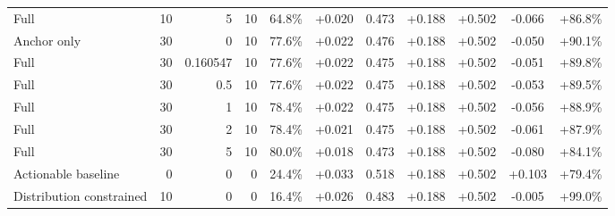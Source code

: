 \begin{table}[htbp]
\begin{tabular}{lrrrccccccc}
Full & 10 & 5 & 10 & 64.8\% & +0.020 & 0.473 & +0.188 & +0.502 & -0.066 & +86.8\% \\
Anchor only & 30 & 0 & 10 & 77.6\% & +0.022 & 0.476 & +0.188 & +0.502 & -0.050 & +90.1\% \\
Full & 30 & 0.160547 & 10 & 77.6\% & +0.022 & 0.475 & +0.188 & +0.502 & -0.051 & +89.8\% \\
Full & 30 & 0.5 & 10 & 77.6\% & +0.022 & 0.475 & +0.188 & +0.502 & -0.053 & +89.5\% \\
Full & 30 & 1 & 10 & 78.4\% & +0.022 & 0.475 & +0.188 & +0.502 & -0.056 & +88.9\% \\
Full & 30 & 2 & 10 & 78.4\% & +0.021 & 0.475 & +0.188 & +0.502 & -0.061 & +87.9\% \\
Full & 30 & 5 & 10 & 80.0\% & +0.018 & 0.473 & +0.188 & +0.502 & -0.080 & +84.1\% \\
Actionable baseline & 0 & 0 & 0 & 24.4\% & +0.033 & 0.518 & +0.188 & +0.502 & +0.103 & +79.4\% \\
Distribution constrained & 10 & 0 & 0 & 16.4\% & +0.026 & 0.483 & +0.188 & +0.502 & -0.005 & +99.0\% \\
\bottomrule
\end{tabular}
\end{table}
